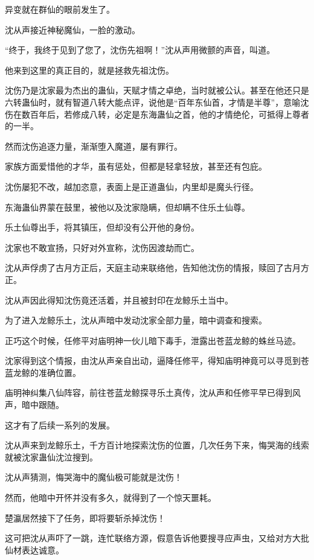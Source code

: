 
\begin{this_body}

异变就在群仙的眼前发生了。

沈从声接近神秘魔仙，一脸的激动。

“终于，我终于见到了您了，沈伤先祖啊！”沈从声用微颤的声音，叫道。

他来到这里的真正目的，就是拯救先祖沈伤。

沈伤乃是沈家最为杰出的蛊仙，天赋才情之卓绝，当时就被公认。甚至在他还只是六转蛊仙时，就有智道八转大能点评，说他是“百年东仙首，才情是半尊”，意喻沈伤在数百年后，若修成八转，必定是东海蛊仙之首，他的才情绝伦，可抵得上尊者的一半。

然而沈伤追逐力量，渐渐堕入魔道，屡有罪行。

家族方面爱惜他的才华，虽有惩处，但都是轻拿轻放，甚至还有包庇。

沈伤屡犯不改，越加恣意，表面上是正道蛊仙，内里却是魔头行径。

东海蛊仙界蒙在鼓里，被他以及沈家隐瞒，但却瞒不住乐土仙尊。

乐土仙尊出手，将其镇压，但却没有公开他的身份。

沈家也不敢宣扬，只好对外宣称，沈伤因渡劫而亡。

沈从声俘虏了古月方正后，天庭主动来联络他，告知他沈伤的情报，赎回了古月方正。

沈从声因此得知沈伤竟还活着，并且被封印在龙鲸乐土当中。

为了进入龙鲸乐土，沈从声暗中发动沈家全部力量，暗中调查和搜索。

正巧这个时候，任修平对庙明神一伙儿暗下毒手，泄露出苍蓝龙鲸的蛛丝马迹。

沈家得到这个情报，由沈从声亲自出动，逼降任修平，得知庙明神竟可以寻觅到苍蓝龙鲸的准确位置。

庙明神纠集八仙阵容，前往苍蓝龙鲸探寻乐土真传，沈从声和任修平早已得到风声，暗中跟随。

这才有了后续一系列的发展。

沈从声来到龙鲸乐土，千方百计地探索沈伤的位置，几次任务下来，悔哭海的线索就被沈家蛊仙沈泣搜到。

沈从声猜测，悔哭海中的魔仙极可能就是沈伤！

然而，他暗中开怀并没有多久，就得到了一个惊天噩耗。

楚瀛居然接下了任务，即将要斩杀掉沈伤！

这可把沈从声吓了一跳，连忙联络方源，假意告诉他要搜寻应声虫，又给对方大批仙材表达诚意。


\end{this_body}
